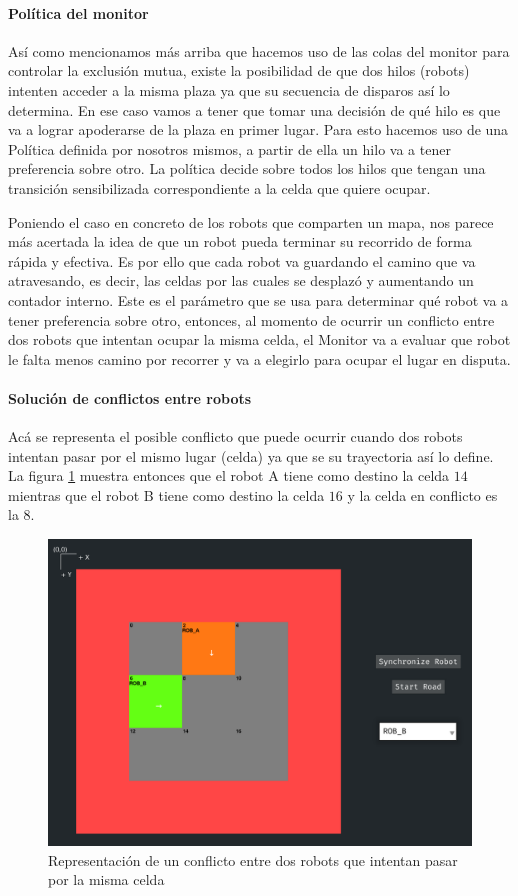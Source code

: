 \paragraph{Política del monitor} \mbox{} \vspace{8pt}

Así como mencionamos más arriba que hacemos uso de las colas del monitor para controlar la exclusión mutua, existe la posibilidad de que dos hilos (robots) intenten acceder a la misma plaza ya que su secuencia de disparos así lo determina. En ese caso vamos a tener que tomar una decisión de qué hilo es que va a lograr apoderarse de la plaza en primer lugar. Para esto hacemos uso de una Política definida por nosotros mismos, a partir de ella un hilo va a tener preferencia sobre otro. La política decide sobre todos los hilos que tengan una transición sensibilizada correspondiente a la celda que quiere ocupar.

Poniendo el caso en concreto de los robots que comparten un mapa, nos parece más acertada la idea de que un robot pueda terminar su recorrido de forma rápida y efectiva. Es por ello que cada robot va guardando el camino que va atravesando, es decir, las celdas por las cuales se desplazó y aumentando un contador interno. Este es el parámetro que se usa para determinar qué robot va a tener preferencia sobre otro, entonces, al momento de ocurrir un conflicto entre dos robots que intentan ocupar la misma celda, el Monitor va a evaluar que robot le falta menos camino por recorrer y va a elegirlo para ocupar el lugar en disputa. 

\paragraph{Solución de conflictos entre robots} \mbox{} \vspace{8pt}

Acá se representa el posible conflicto que puede ocurrir cuando dos robots intentan pasar por el mismo lugar (celda) ya que se su trayectoria así lo define. La figura \ref{fig:conflicto_map} muestra entonces que el robot A tiene como destino la celda $14$ mientras que el robot B tiene como destino la celda $16$ y la celda en conflicto es la $8$.

\begin{figure}[H]
    \centering
    \includegraphics[trim={1.6cm 0.3cm 0 1.5cm}, clip, width=0.7\linewidth]{images/conflicto_map.png}
    \caption{Representación de un conflicto entre dos robots que intentan pasar por la misma celda}
    \label{fig:conflicto_map}
\end{figure}

